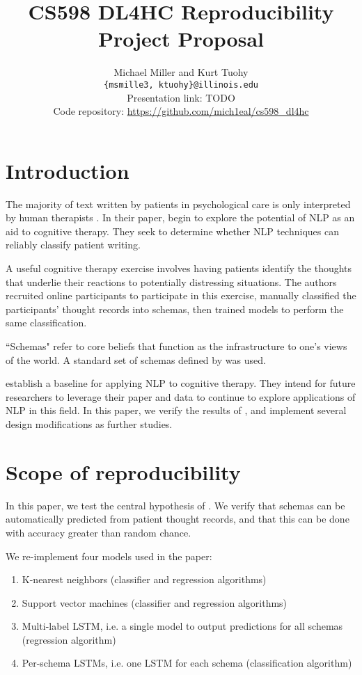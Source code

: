 \documentclass[11pt,a4paper]{article}
\title{CS598 DL4HC Reproducibility Project Proposal}
\author{Michael Miller and Kurt Tuohy\\
  \texttt{\{msmille3, ktuohy\}@illinois.edu}
  \\[2em]
  Presentation link: TODO\url{} \\
  Code repository: \url{https://github.com/mich1eal/cs598_dl4hc} \citep{cs598_repo}}
\begin{document}
\maketitle


\section{Introduction}

The majority of text written by patients in psychological care is only interpreted by human therapists \citep{burger_2021}. In their paper, \citeauthor{burger_2021} begin to explore the potential of NLP as an aid to cognitive therapy. They seek to determine whether NLP techniques can reliably classify patient writing.

A useful cognitive therapy exercise involves having patients identify the thoughts that underlie their reactions to potentially distressing situations. The authors recruited online participants to participate in this exercise, manually classified the participants' thought records into schemas, then trained models to perform the same classification.

``Schemas" refer to core beliefs that function as the infrastructure to one's views of the world. A standard set of schemas defined by \citeauthor{millings_2015} was used.

\citeauthor{burger_2021} establish a baseline for applying NLP to cognitive therapy. They intend for future researchers to leverage their paper and data to continue to explore applications of NLP in this field. In this paper, we verify the results of \citeauthor{burger_2021}, and implement several design modifications as further studies. 

\section{Scope of reproducibility}

In this paper, we test the central hypothesis of \citeauthor{burger_2021}. We verify that schemas can be automatically predicted from patient thought records, and that this can be done with accuracy greater than random chance.

We re-implement four models used in the paper:
\begin{enumerate}
    \item K-nearest neighbors (classifier and regression algorithms)
    \item Support vector machines (classifier and regression algorithms)
    \item Multi-label LSTM, i.e. a single model to output predictions for all schemas (regression algorithm)
    \item Per-schema LSTMs, i.e. one LSTM for each schema (classification algorithm)
\end{enumerate}
\end{document}
